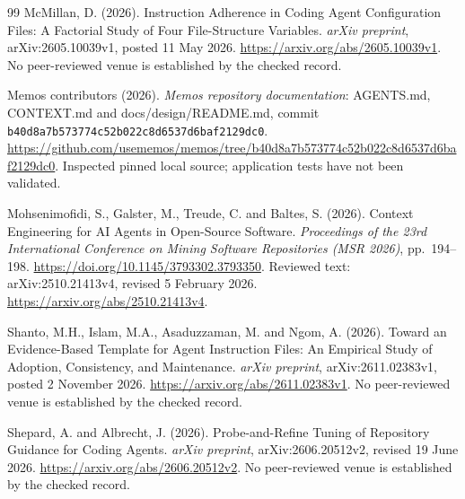 \begin{thebibliography}{99}
McMillan, D. (2026).
Instruction Adherence in Coding Agent Configuration Files: A Factorial Study
of Four File-Structure Variables.
\textit{arXiv preprint}, arXiv:2605.10039v1, posted 11 May 2026.
\url{https://arxiv.org/abs/2605.10039v1}.
No peer-reviewed venue is established by the checked record.

Memos contributors (2026).
\textit{Memos repository documentation}: AGENTS.md, CONTEXT.md and
docs/design/README.md, commit
\nolinkurl{b40d8a7b573774c52b022c8d6537d6baf2129dc0}.
\url{https://github.com/usememos/memos/tree/b40d8a7b573774c52b022c8d6537d6baf2129dc0}.
Inspected pinned local source; application tests have not been validated.

Mohsenimofidi, S., Galster, M., Treude, C. and Baltes, S. (2026).
Context Engineering for AI Agents in Open-Source Software.
\textit{Proceedings of the 23rd International Conference on Mining Software
Repositories (MSR 2026)}, pp.~194--198.
\url{https://doi.org/10.1145/3793302.3793350}.
Reviewed text: arXiv:2510.21413v4, revised 5 February 2026.
\url{https://arxiv.org/abs/2510.21413v4}.

Shanto, M.H., Islam, M.A., Asaduzzaman, M. and Ngom, A. (2026).
Toward an Evidence-Based Template for Agent Instruction Files:
An Empirical Study of Adoption, Consistency, and Maintenance.
\textit{arXiv preprint}, arXiv:2611.02383v1, posted 2 November 2026.
\url{https://arxiv.org/abs/2611.02383v1}.
No peer-reviewed venue is established by the checked record.

Shepard, A. and Albrecht, J. (2026).
Probe-and-Refine Tuning of Repository Guidance for Coding Agents.
\textit{arXiv preprint}, arXiv:2606.20512v2, revised 19 June 2026.
\url{https://arxiv.org/abs/2606.20512v2}.
No peer-reviewed venue is established by the checked record.

\end{thebibliography}
\endgroup
